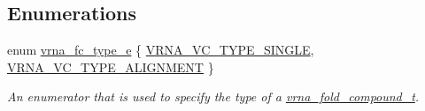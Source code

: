 \subsection*{Enumerations}
\begin{DoxyCompactItemize}
\item 
enum \hyperlink{group__fold__compound_ga01a4ff86fa71deaaa5d1abbd95a1447d}{vrna\+\_\+fc\+\_\+type\+\_\+e} \{ \hyperlink{group__fold__compound_gga01a4ff86fa71deaaa5d1abbd95a1447da1608d3aa78905fc39e0d25a624ac9512}{V\+R\+N\+A\+\_\+\+V\+C\+\_\+\+T\+Y\+P\+E\+\_\+\+S\+I\+N\+G\+L\+E}, 
\hyperlink{group__fold__compound_gga01a4ff86fa71deaaa5d1abbd95a1447da056345f1bcfe7cd595d1fd437c05246d}{V\+R\+N\+A\+\_\+\+V\+C\+\_\+\+T\+Y\+P\+E\+\_\+\+A\+L\+I\+G\+N\+M\+E\+N\+T}
 \}
\begin{DoxyCompactList}\small\item\em An enumerator that is used to specify the type of a \hyperlink{group__fold__compound_ga1b0cef17fd40466cef5968eaeeff6166}{vrna\+\_\+fold\+\_\+compound\+\_\+t}. \end{DoxyCompactList}\end{DoxyCompactItemize}
